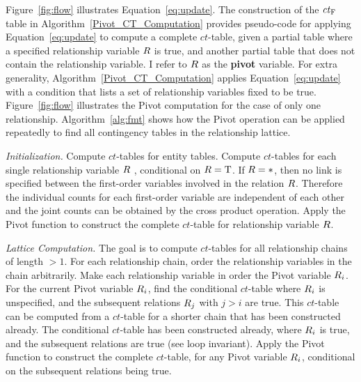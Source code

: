 \documentclass{sfuthesis}
\newcommand{\ct}{\mathit{ct}}
\begin{document}
Figure~\ref{fig:flow} illustrates Equation~\eqref{eq:update}. 
The construction of the $\ct_{\false}$ table in Algorithm~\ref{Pivot_CT_Computation} provides pseudo-code for applying Equation~\eqref{eq:update} to compute a complete $\ct$-table, given a partial table where a specified relationship variable $R$  is true, and another partial table that does not contain the relationship variable. 
I  refer to $R$ as the \textbf{pivot} variable. For extra generality, Algorithm~\ref{Pivot_CT_Computation} applies Equation~\eqref{eq:update} with a condition that lists a set of relationship variables fixed to be true.  Figure~\ref{fig:flow} illustrates the  Pivot computation for the case of only one relationship. 
Algorithm~\ref{alg:fmt} shows how the Pivot operation can be applied repeatedly to find all contingency tables in the relationship lattice. 


{\em Initialization.} Compute $\ct$-tables for entity tables.
Compute $\ct$-tables for each single relationship variable $R$ , conditional on $R = \mathrm{T}$. %
If $R = \ast$, then no link is specified between the first-order variables involved in the relation $R$. Therefore the individual counts for each first-order variable are independent of each other and the joint counts can be obtained by the cross product operation. %
Apply the Pivot function to construct the  complete $\ct$-table for relationship variable $R$. %

{\em Lattice Computation.} The goal is to compute $\ct$-tables for all relationship chains of length $>1$. For each relationship chain, order the relationship variables in the chain arbitrarily. Make each relationship variable in order the Pivot variable $R_{i}$. For the current Pivot variable $R_{i}$, find the conditional $\ct$-table where $R_{i}$ is unspecified, and the subsequent relations $R_{j}$ with $j>i$ are true. This $\ct$-table can be computed from a $ct$-table for a shorter chain that has been constructed already. The conditional $ct$-table   has been constructed already, where $R_{i}$ is true, and the subsequent relations are true (see loop invariant). Apply the Pivot function to construct the  complete $\ct$-table, for any Pivot variable $R_{i}$,  conditional on the subsequent relations being true. 
\end{document}
